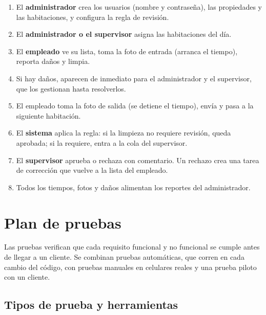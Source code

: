 \documentclass[11pt,a4paper]{article}
\begin{document}
\begin{enumerate}[leftmargin=1.4em]
  \item El \textbf{administrador} crea los usuarios (nombre y contraseña), las propiedades y las habitaciones, y configura la regla de revisión.
  \item El \textbf{administrador o el supervisor} asigna las habitaciones del día.
  \item El \textbf{empleado} ve su lista, toma la foto de entrada (arranca el tiempo), reporta daños y limpia.
  \item Si hay daños, aparecen de inmediato para el administrador y el supervisor, que los gestionan hasta resolverlos.
  \item El empleado toma la foto de salida (se detiene el tiempo), envía y pasa a la siguiente habitación.
  \item El \textbf{sistema} aplica la regla: si la limpieza no requiere revisión, queda aprobada; si la requiere, entra a la cola del supervisor.
  \item El \textbf{supervisor} aprueba o rechaza con comentario. Un rechazo crea una tarea de corrección que vuelve a la lista del empleado.
  \item Todos los tiempos, fotos y daños alimentan los reportes del administrador.
\end{enumerate}

\section{Plan de pruebas}

Las pruebas verifican que cada requisito funcional y no funcional se cumple antes de llegar a un cliente. Se combinan pruebas automáticas, que corren en cada cambio del código, con pruebas manuales en celulares reales y una prueba piloto con un cliente.

\subsection{Tipos de prueba y herramientas}
\end{document}
